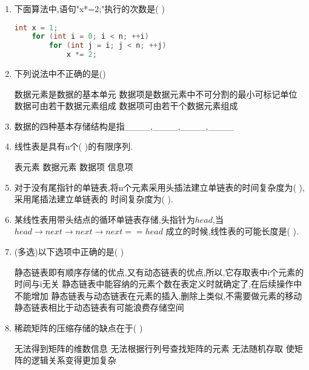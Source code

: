 \documentclass[12pt, a4paper, oneside, UTF8]{ctexbook}
\begin{document}
\begin{enumerate}
    \item 下面算法中,语句"x*=2;"执行的次数是(   ) 
    \begin{lstlisting}[language=C]
    int x = 1;
    for (int i = 0; i < n; ++i)
        for (int j = i; j < n; ++j)
            x *= 2;
    \end{lstlisting}

    \item 下列说法中不正确的是() 
    \begin{choices}[1]
        \task 数据元素是数据的基本单元
        \task 数据项是数据元素中不可分割的最小可标记单位
        \task 数据可由若干数据元素组成 
        \task 数据项可由若干个数据元素组成 
    \end{choices}

    \item 数据的四种基本存储结构是指\_\_\_\_,\_\_\_\_,\_\_\_\_,\_\_\_\_ 

    \item 线性表是具有n个(    )的有限序列. 
    \begin{choices}
        \task 表元素 
        \task 数据元素 
        \task 数据项 
        \task 信息项 
    \end{choices}

    \item 对于没有尾指针的单链表,将n个元素采用头插法建立单链表的时间复杂度为(    ),采用尾插法建立单链表的
    时间复杂度为(    ). 

    \item 某线性表用带头结点的循环单链表存储,头指针为$head$,当$head\rightarrow next\rightarrow next \rightarrow next == head$
    成立的时候,线性表的可能长度是(    ). 

    \item (多选)以下选项中正确的是(   ) 
    \begin{choices}[1]
        \task 静态链表即有顺序存储的优点,又有动态链表的优点,所以,它存取表中i个元素的时间与i无关 
        \task 静态链表中能容纳的元素个数在表定义时就确定了,在后续操作中不能增加 
        \task 静态链表与动态链表在元素的插入,删除上类似,不需要做元素的移动 
        \task 静态链表相比于动态链表有可能浪费存储空间 
    \end{choices}

    \item 稀疏矩阵的压缩存储的缺点在于(  ) 
    \begin{choices}[2]
        \task 无法得到矩阵的维数信息 
        \task 无法根据行列号查找矩阵的元素 
        \task 无法随机存取 
        \task 使矩阵的逻辑关系变得更加复杂 
    \end{choices}


\end{enumerate}
\end{document}
